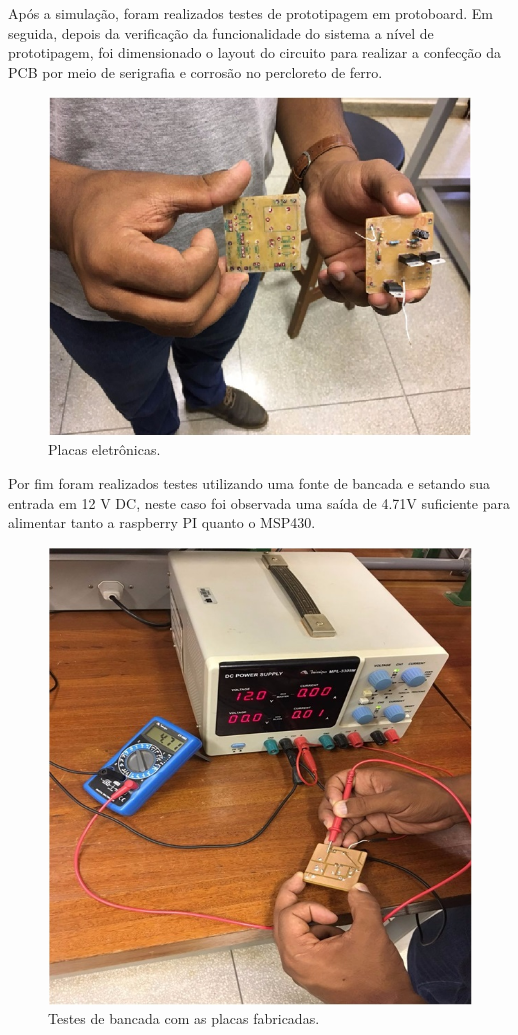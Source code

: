 Após a simulação, foram realizados testes de prototipagem em protoboard. Em seguida, depois da verificação da funcionalidade do sistema a nível de prototipagem, foi dimensionado o layout do circuito para realizar a confecção da PCB por meio de serigrafia e corrosão no percloreto de ferro.


\begin{figure}[H]
\centering
\includegraphics[width=16cm]{figuras/demonstracao_eletronica.jpg}
\caption{Placas eletrônicas.}
\end{figure}

Por fim foram realizados testes utilizando uma fonte de bancada e setando sua entrada em 12 V DC, neste caso foi observada  uma saída de 4.71V suficiente para alimentar tanto a raspberry PI quanto o MSP430.


\begin{figure}[H]
\centering
\includegraphics[width=16cm]{figuras/testedebancada_eletronica.jpg}
\caption{Testes de bancada com as placas fabricadas.}
\end{figure}

